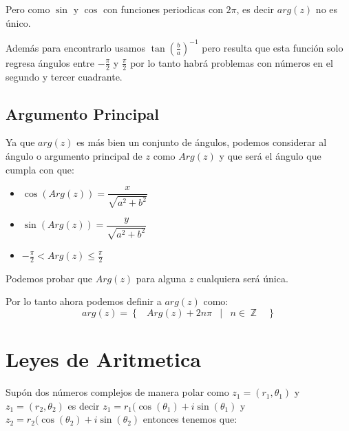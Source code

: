 \documentclass[12pt, fleqn]{report}                             %
\DeclareMathOperator \Space {\quad}                             %
\DeclareMathOperator \MiniSpace {\;}                            %
\newcommand \Such {\MiniSpace|\MiniSpace}                       %
\newcommand{\Set}[1]{\left\{ \MiniSpace #1 \MiniSpace \right\}} %
\newcommand{\Wrap}[1]{\left( #1 \right)}                        %
\DeclareMathOperator \Integers  {\mathbb{Z}}                     %
\newcommand{\Cos}[1]{\cos\Wrap{#1}}                             %
\newcommand{\Sin}[1]{\sin\Wrap{#1}}                             %
\begin{document}
            Pero como $\sin$ y $\cos$ con funciones periodicas con $2\pi$, es decir $arg(z)$ no es único.

            Además para encontrarlo usamos $\tan(\frac{b}{a})^{-1}$ pero resulta que esta función solo
            regresa ángulos entre $-\frac{\pi}{2}$ y $\frac{\pi}{2}$ por lo tanto habrá problemas con
            números en el segundo y tercer cuadrante.

            \subsection*{Argumento Principal}

                Ya que $arg(z)$ es más bien un conjunto de ángulos, podemos considerar al ángulo o 
                argumento principal de $z$ como $Arg(z)$ y que será el ángulo que cumpla con que:

                \begin{itemize}
                    \item $\Cos{Arg(z)} = \dfrac{x}{\sqrt{a^2+b^2}}$
                    \item $\Sin{Arg(z)}   = \dfrac{y}{\sqrt{a^2+b^2}}$
                    \item $-\frac{\pi}{2} < Arg(z) \leq \frac{\pi}{2}$
                \end{itemize}

                Podemos probar que $Arg(z)$ para alguna $z$ cualquiera será única.

                Por lo tanto ahora podemos definir a $arg(z)$ como:
                \begin{equation}
                    arg(z) = \Set{ Arg(z) + 2n\pi \Such n \in \Integers }
                \end{equation}


        \clearpage
        \section{Leyes de Aritmetica}
            
            Supón dos números complejos de manera polar como $z_1 = (r_1, \theta_1)$ y $z_1 = (r_2, \theta_2)$ 
            es decir $z_1 = r_1(\Cos{\theta_1} + i\Sin{\theta_1}$ y
            $z_2 = r_2(\Cos{\theta_2} + i\Sin{\theta_2}$ entonces tenemos que:
\end{document}
